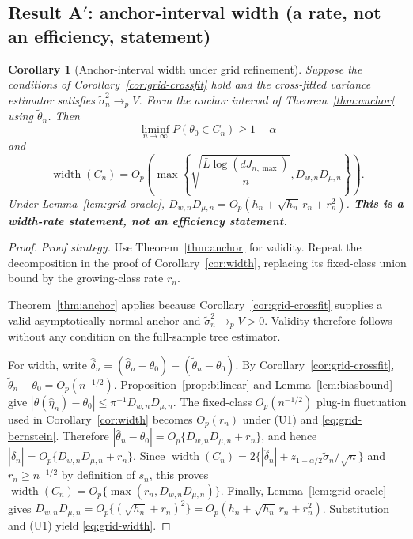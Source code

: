 \documentclass[11pt]{article}
\theoremstyle{plain}
\newtheorem{corollary}[theorem]{Corollary}
\theoremstyle{definition}
\theoremstyle{remark}
\newcommand{\thetatil}{\widetilde{\theta}}
\begin{document}
\subsection{Result A$'$: anchor-interval width (a rate, not an efficiency,
statement)}\label{sec:result-aprime}

\begin{corollary}[Anchor-interval width under grid refinement]
\label{cor:grid-width}
Suppose the conditions of Corollary~\ref{cor:grid-crossfit} hold and the
cross-fitted variance estimator satisfies $\widetilde\sigma_n^2\to_pV$.
Form the anchor interval of Theorem~\ref{thm:anchor} using $\thetatil_n$.
Then
\[
 \liminf_{n\to\infty}P(\theta_0\in C_n)\ge1-\alpha
\]
and
\begin{equation}\label{eq:grid-width}
 \operatorname{width}(C_n)
 =O_p\!\left(
   \max\left\{
     \sqrt{\frac{\bar L\log(dJ_{n,\max})}{n}},
     D_{w,n}D_{\mu,n}
   \right\}
 \right).
\end{equation}
Under Lemma~\ref{lem:grid-oracle},
$D_{w,n}D_{\mu,n}=O_p\left(h_n+\sqrt{h_n}\,r_n+r_n^2\right)$. \textbf{This is
a width-rate statement, not an efficiency statement.}
\end{corollary}

\begin{proof}
\emph{Proof strategy.} Use Theorem~\ref{thm:anchor} for validity. Repeat
the decomposition in the proof of Corollary~\ref{cor:width}, replacing its
fixed-class union bound by the growing-class rate $r_n$.

Theorem~\ref{thm:anchor} applies because Corollary~\ref{cor:grid-crossfit}
supplies a valid asymptotically normal anchor and
$\widetilde\sigma_n^2\to_pV>0$. Validity therefore follows without any
condition on the full-sample tree estimator.

For width, write $\widehat\delta_n=(\widehat\theta_n-\theta_0)
-(\thetatil_n-\theta_0)$. By Corollary~\ref{cor:grid-crossfit},
$\thetatil_n-\theta_0=O_p(n^{-1/2})$. Proposition~\ref{prop:bilinear} and
Lemma~\ref{lem:biasbound} give
$|\theta(\widehat\eta_n)-\theta_0|\le\pi^{-1}D_{w,n}D_{\mu,n}$. The
fixed-class $O_p(n^{-1/2})$ plug-in fluctuation used in
Corollary~\ref{cor:width} becomes $O_p(r_n)$ under (U1) and
\eqref{eq:grid-bernstein}. Therefore
$|\widehat\theta_n-\theta_0|=O_p\{D_{w,n}D_{\mu,n}+r_n\}$, and hence
$|\widehat\delta_n|=O_p\{D_{w,n}D_{\mu,n}+r_n\}$. Since
$\operatorname{width}(C_n)=2\{|\widehat\delta_n|
+z_{1-\alpha/2}\widetilde\sigma_n/\sqrt n\}$ and $r_n\ge n^{-1/2}$ by
definition of $s_n$, this proves
$\operatorname{width}(C_n)=O_p\{\max(r_n,D_{w,n}D_{\mu,n})\}$. Finally,
Lemma~\ref{lem:grid-oracle} gives $D_{w,n}D_{\mu,n}=O_p\{(\sqrt{h_n}+r_n)^2\}
=O_p(h_n+\sqrt{h_n}\,r_n+r_n^2)$. Substitution and (U1) yield
\eqref{eq:grid-width}.
\end{proof}
\end{document}
